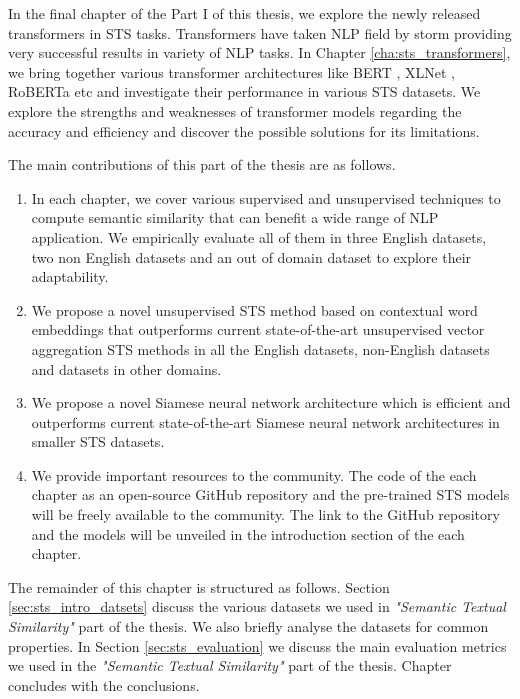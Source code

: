 In the final chapter of the Part I of this thesis, we explore the newly released transformers in STS tasks. Transformers have taken NLP field by storm providing very successful results in variety of NLP tasks. In Chapter \ref{cha:sts_transformers}, we bring together various transformer architectures like BERT \cite{devlin-etal-2019-bert}, XLNet \cite{yang2019xlnet}, RoBERTa \cite{liu2019roberta} etc and investigate their performance in various STS datasets. We explore the strengths and weaknesses of transformer models regarding the accuracy and efficiency and discover the possible solutions for its limitations.

The main contributions of this part of the thesis are as follows.

\begin{enumerate}
	\item In each chapter, we cover various supervised and unsupervised techniques to compute semantic similarity that can benefit a wide range of NLP application. We empirically evaluate all of them in three English datasets, two non English datasets and an out of domain dataset to explore their adaptability. 
	
	\item We propose a novel unsupervised STS method based on contextual word embeddings that outperforms current state-of-the-art unsupervised vector aggregation STS methods in all the English datasets, non-English datasets and datasets in other domains. 
	
	\item We propose a novel Siamese neural network architecture which is efficient and outperforms current state-of-the-art Siamese neural network architectures in smaller STS datasets. 
	
	\item We provide important resources to the community. The code of the each chapter as an open-source GitHub repository and the pre-trained STS models will be freely available to the community. The link to the GitHub repository and the models will be unveiled in the introduction section of the each chapter. 
\end{enumerate}

The remainder of this chapter is structured as follows. Section \ref{sec:sts_intro_datsets} discuss the various datasets we used in \textit{"Semantic Textual Similarity"} part of the thesis. We also briefly analyse the datasets for common properties. In Section \ref{sec:sts_evaluation} we discuss the main evaluation metrics we used in the \textit{"Semantic Textual Similarity"} part of the thesis. Chapter concludes with the conclusions.


